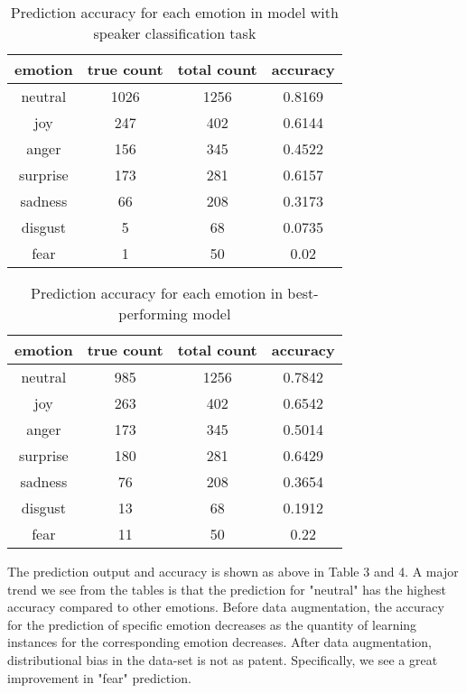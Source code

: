 \documentclass[11pt]{article}
\begin{document}
\begin{table}[hbt]
  \centering
  \begin{tabular}{c|c|c|c}
    emotion & true count & total count & accuracy \\
    \hline
    neutral & 1026 & 1256 & 0.8169 \\
    \hline
    joy & 247 & 402 & 0.6144 \\
    \hline
    anger & 156 & 345 & 0.4522  \\
    \hline
    surprise & 173 & 281 & 0.6157 \\
    \hline
    sadness & 66 & 208 & 0.3173 \\
    \hline
    disgust & 5 & 68 & 0.0735  \\
    \hline
    fear & 1 & 50 & 0.02 \\
  \end{tabular}
  \caption{Prediction accuracy for each emotion in model with speaker classification task}
\end{table}

\begin{table}[hbt]
  \centering
  \begin{tabular}{c|c|c|c}
    emotion & true count & total count & accuracy \\
    \hline
    neutral & 985 & 1256 & 0.7842 \\
    \hline
    joy & 263 & 402 & 0.6542 \\
    \hline
    anger & 173 & 345 & 0.5014  \\
    \hline
    surprise & 180 & 281 & 0.6429 \\
    \hline
    sadness & 76 & 208 & 0.3654\\
    \hline
    disgust  & 13 & 68 & 0.1912  \\
    \hline
    fear & 11 & 50 & 0.22 \\
  \end{tabular}
  \caption{Prediction accuracy for each emotion in best-performing model}
\end{table}

The prediction output and accuracy is shown as above in Table 3 and 4. A major trend we see from the tables is that the prediction for "neutral" has the highest accuracy compared to other emotions. Before data augmentation, the accuracy for the prediction of specific emotion decreases as the quantity of learning instances for the corresponding emotion decreases. After data augmentation, distributional bias in the data-set is not as patent. Specifically, we see a great improvement in "fear" prediction.
\end{document}
